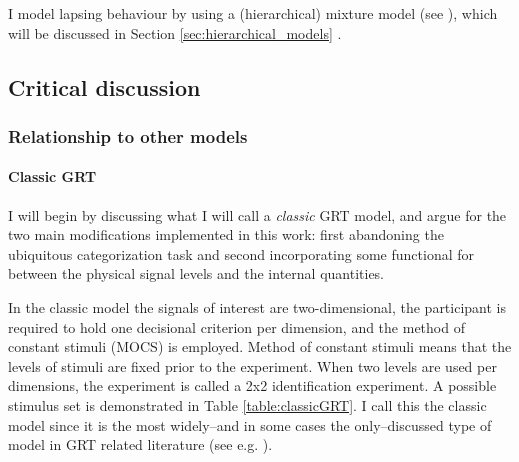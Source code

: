 \documentclass{article}\usepackage{knitr}
\begin{document}
I model lapsing behaviour by using a (hierarchical) mixture model (see \citet{zeigenfuse2010}), which will be discussed in Section \ref{sec:hierarchical_models} \textit{}.



\subsection{Critical discussion}
\label{sec:grt_criticism}

\subsubsection{Relationship to other models}
\label{sec:grt_classic}

\paragraph{Classic GRT}

I will begin by discussing what I will call a \textit{classic} GRT model, and argue for the two main modifications implemented in this work: first abandoning the ubiquitous categorization task and second incorporating some functional for between the physical signal levels and the internal quantities. 

In the classic model the signals of interest are two-dimensional, the participant is required to hold one decisional criterion per dimension, and the method of constant stimuli (MOCS) is employed. Method of constant stimuli means that the levels of stimuli are fixed prior to the experiment. When two levels are used per dimensions, the experiment is called a 2x2 identification experiment.  A possible stimulus set is demonstrated in Table \ref{table:classicGRT}. I call this the classic model since it is the most widely--and in some cases the only--discussed type of model in GRT related literature (see e.g. \cite{ashby2015, ashby1986, cohen2003, kadlec1992, silbert2010, silbert2013}). 
\end{document}
